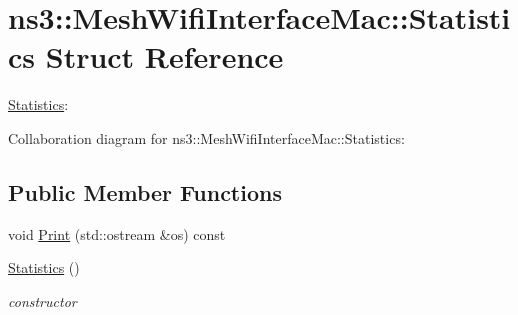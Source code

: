 \hypertarget{structns3_1_1MeshWifiInterfaceMac_1_1Statistics}{}\section{ns3\+:\+:Mesh\+Wifi\+Interface\+Mac\+:\+:Statistics Struct Reference}
\label{structns3_1_1MeshWifiInterfaceMac_1_1Statistics}


\hyperlink{structns3_1_1MeshWifiInterfaceMac_1_1Statistics}{Statistics}\+:  




Collaboration diagram for ns3\+:\+:Mesh\+Wifi\+Interface\+Mac\+:\+:Statistics\+:
\subsection*{Public Member Functions}
\begin{DoxyCompactItemize}
\item 
void \hyperlink{structns3_1_1MeshWifiInterfaceMac_1_1Statistics_aaed87bf29f8a8410d2b7ac521cdd5e84}{Print} (std\+::ostream \&os) const 
\item 
\hyperlink{structns3_1_1MeshWifiInterfaceMac_1_1Statistics_a6d20c9e94261942172477f02470d1d5f}{Statistics} ()
\begin{DoxyCompactList}\small\item\em constructor \end{DoxyCompactList}\end{DoxyCompactItemize}
